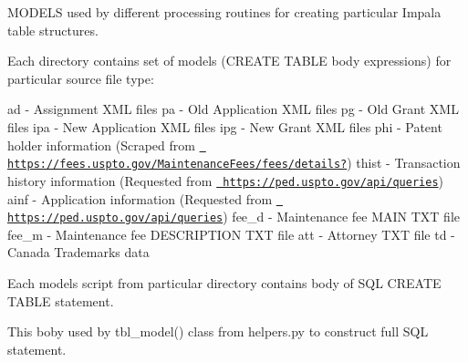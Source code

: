 M\+O\+D\+E\+LS used by different processing routines for creating particular Impala table structures. \begin{DoxyVerb}Each directory contains set of models (CREATE TABLE body expressions) for particular source file type:
\end{DoxyVerb}


ad -\/ Assignment X\+ML files pa -\/ Old Application X\+ML files pg -\/ Old Grant X\+ML files ipa -\/ New Application X\+ML files ipg -\/ New Grant X\+ML files phi -\/ Patent holder information (Scraped from \href{https://fees.uspto.gov/MaintenanceFees/fees/details?}{\texttt{ https\+://fees.\+uspto.\+gov/\+Maintenance\+Fees/fees/details?}}) thist -\/ Transaction history information (Requested from \href{https://ped.uspto.gov/api/queries}{\texttt{ https\+://ped.\+uspto.\+gov/api/queries}}) ainf -\/ Application information (Requested from \href{https://ped.uspto.gov/api/queries}{\texttt{ https\+://ped.\+uspto.\+gov/api/queries}}) fee\+\_\+d -\/ Maintenance fee M\+A\+IN T\+XT file fee\+\_\+m -\/ Maintenance fee D\+E\+S\+C\+R\+I\+P\+T\+I\+ON T\+XT file att -\/ Attorney T\+XT file td -\/ Canada Trademarks data \begin{DoxyVerb}Each models script from particular directory contains body of SQL CREATE TABLE statement.
\end{DoxyVerb}
 This boby used by tbl\+\_\+model() class from helpers.\+py to construct full S\+QL statement. 